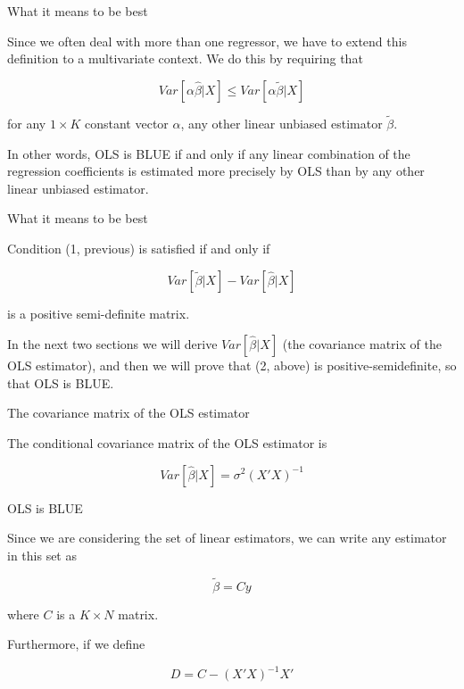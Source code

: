 \documentclass[australian,ignorenonframetext,aspectratio=169]{beamer}
\begin{document}
\begin{frame}{What it means to be best}
\protect\hypertarget{what-it-means-to-be-best-1}{}

Since we often deal with more than one regressor, we have to extend this
definition to a multivariate context. We do this by requiring that

\[Var[\alpha\widehat{\beta}|X] \leq Var[\alpha\widetilde{\beta}|X]\]

for any \(1 \times K\) constant vector \(\alpha\), any other linear
unbiased estimator \(\widetilde{\beta}\).

In other words, OLS is BLUE if and only if any linear combination of the
regression coefficients is estimated more precisely by OLS than by any
other linear unbiased estimator.

\end{frame}

\begin{frame}{What it means to be best}
\protect\hypertarget{what-it-means-to-be-best-2}{}

Condition (1, previous) is satisfied if and only if

\[Var[\widetilde{\beta}|X] - Var[\widehat{\beta}|X]\]

is a positive semi-definite matrix.

In the next two sections we will derive \(Var[\widehat{\beta}|X]\) (the
covariance matrix of the OLS estimator), and then we will prove that (2,
above) is positive-semidefinite, so that OLS is BLUE.

\end{frame}

\begin{frame}{The covariance matrix of the OLS estimator}
\protect\hypertarget{the-covariance-matrix-of-the-ols-estimator}{}

The conditional covariance matrix of the OLS estimator is

\[Var[\widehat{\beta}|X] = \sigma^2(X'X)^{-1}\]

\end{frame}

\begin{frame}{OLS is BLUE}
\protect\hypertarget{ols-is-blue}{}

Since we are considering the set of linear estimators, we can write any
estimator in this set as

\[\widetilde{\beta} = Cy\]

where \(C\) is a \(K \times N\) matrix.

Furthermore, if we define

\[D = C - (X'X)^{-1}X'\]

\end{frame}
\end{document}
